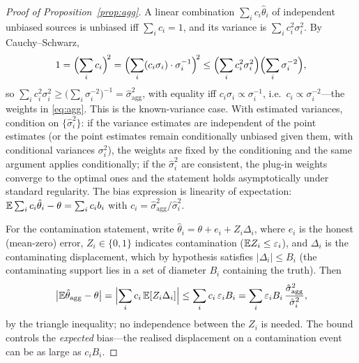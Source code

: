 \begin{proof}[Proof of Proposition~\ref{prop:agg}]
A linear combination $\sum_i c_i\hat\theta_i$ of independent unbiased sources is unbiased iff $\sum_i c_i=1$, and its variance is $\sum_i c_i^2\sigma_i^2$. By Cauchy--Schwarz,
\[
1=\Bigl(\sum_i c_i\Bigr)^{\!2}
=\Bigl(\sum_i (c_i\sigma_i)\cdot\sigma_i^{-1}\Bigr)^{\!2}
\le\Bigl(\sum_i c_i^2\sigma_i^2\Bigr)\Bigl(\sum_i \sigma_i^{-2}\Bigr),
\]
so $\sum_i c_i^2\sigma_i^2\ge\bigl(\sum_i\sigma_i^{-2}\bigr)^{-1}=\hat\sigma_{\mathrm{agg}}^2$, with equality iff $c_i\sigma_i\propto\sigma_i^{-1}$, i.e.\ $c_i\propto\sigma_i^{-2}$---the weights in \eqref{eq:agg}. This is the known-variance case. With estimated variances, condition on $\{\hat\sigma_i^2\}$: if the variance estimates are independent of the point estimates (or the point estimates remain conditionally unbiased given them, with conditional variances $\sigma_i^2$), the weights are fixed by the conditioning and the same argument applies conditionally; if the $\hat\sigma_i^2$ are consistent, the plug-in weights converge to the optimal ones and the statement holds asymptotically under standard regularity. The bias expression is linearity of expectation: $\mathbb{E}\sum_i c_i\hat\theta_i-\theta=\sum_i c_i b_i$ with $c_i=\hat\sigma_{\mathrm{agg}}^2/\hat\sigma_i^2$.

For the contamination statement, write $\hat\theta_i=\theta+e_i+Z_i\Delta_i$, where $e_i$ is the honest (mean-zero) error, $Z_i\in\{0,1\}$ indicates contamination ($\mathbb{E} Z_i\le\varepsilon_i$), and $\Delta_i$ is the contaminating displacement, which by hypothesis satisfies $|\Delta_i|\le B_i$ (the contaminating support lies in a set of diameter $B_i$ containing the truth). Then
\[
\bigl|\mathbb{E}\hat\theta_{\mathrm{agg}}-\theta\bigr|
=\Bigl|\sum_i c_i\,\mathbb{E}[Z_i\Delta_i]\Bigr|
\le\sum_i c_i\,\varepsilon_i B_i
=\sum_i \varepsilon_i B_i\,\frac{\hat\sigma_{\mathrm{agg}}^2}{\hat\sigma_i^2},
\]
by the triangle inequality; no independence between the $Z_i$ is needed. The bound controls the \emph{expected} bias---the realised displacement on a contamination event can be as large as $c_iB_i$.
\end{proof}

